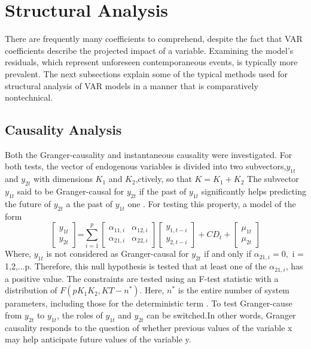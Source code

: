 \section{Structural Analysis}
There are frequently many coefficients to comprehend, despite the fact that VAR coefficients describe the projected impact of a variable. Examining the model's residuals, which represent unforeseen contemporaneous events, is typically more prevalent. The next subsections explain some of the typical methods used for structural analysis of VAR models in a manner that is comparatively nontechnical.
\subsection{Causality Analysis} Both the Granger-causality and instantaneous causality were investigated. For both tests, the vector of endogenous variables is divided into two subvectors,$y_{1t}$ and $y_{2t}$ with dimensions $K_{1}$ and $K_{2}$,ctively, so that $K = K_{1} + K_{2}$ The subvector $y_{1t}$ said to be Granger-causal for
$y_{2t}$ if the past of $y_{1t}$ significantly helps predicting the future of $y_{2t}$ a the past of $y_{1t}$ one \parencite{granger1969investigating}. For testing this property,
a model of the form
\begin{equation}
	\displaystyle
	\left[ \begin{array}{c} y_{1t} \\ y_{2t}  \end{array} \right] \mbox{=} \sum_{i=1}^{p}\left[\begin{array}{cc}
		\alpha_{11,i} & \alpha_{12,i} \\
		\alpha_{21,i} & \alpha_{22,i} 
	\end{array}\right]\left[\begin{array}{c}
		y_{1,t-i}\\
		y_{2,t-i}
	\end{array}\right] + CD_{t} + \left[ \begin{array}{c}
		\mu_{1t}\\
		\mu_{2t}
	\end{array}\right]
\end{equation}
Where, $y_{1t}$ is not considered as  Granger-causal for $y_{2t}$ if and only if $ \alpha_{21,i} = 0,$ i = 1,2,...p.
Therefore, this null hypothesis is tested that at least one of the $\alpha_{21,i}$, has a positive value. The constraints are tested using an F-test statistic with a distribution of $F(pK_{1}K_{2}, KT - n^{*})$. Here, $n^{*}$ is the entire number of system parameters, including those for the deterministic term \parencite{lutkepohl2005new}. To test Granger-cause from $y_{2t}$ to $y_{1t}$, the roles of $y_{1t}$ and $y_{2t}$ can be switched.In other words, Granger causality responds to the question of whether previous values of the variable x may help anticipate future values of the variable y.

